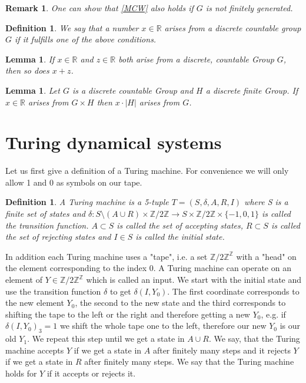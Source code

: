 \documentclass[12pt,a4paper]{scrartcl}
\newtheorem{Definition}[Theorem]{Definition}
\newtheorem{Lemma}[Theorem]{Lemma}
\newtheorem{Remark}[Theorem]{Remark}
\numberwithin{equation}{section}
\newcommand{\R}{\mathbb{R}} %
\newcommand{\Z}{\mathbb{Z}} %
\newcommand{\2}{\mathbb{Z} / 2 \mathbb{Z}}
\newcommand{\1}{\bar{1}}
\newcommand{\0}{\bar{0}}
\begin{document}
\begin{Remark}
	One can show that \ref{MCW} also holds if $G$ is not finitely generated.
\end{Remark}
\begin{Definition}
	We say that a number $x \in \R$ arises from a discrete countable group $G$ if it fulfills one of the above conditions.
\end{Definition}
\begin{Lemma}\label{add}
	If $x \in \R$ and $z \in \R$ both arise from a discrete, countable Group $G$, then so does $x + z$.
\end{Lemma}
\begin{Lemma}\label{mult}
	Let $G$ is a discrete countable Group and $H$ a discrete finite Group. If $x \in \R$ arises from $G \times H$ then $x \cdot |H|$ arises from $G$.
\end{Lemma}
\section{Turing dynamical systems}
Let us first give a definition of a Turing machine. For convenience we will only allow 1 and 0 as symbols on our tape.
\begin{Definition}
	A Turing machine is a 5-tuple $T=(S,\delta, A, R, I)$ where S is a finite set of states and $\delta: S \setminus(A \cup R) \times \2 \to S \times \2 \times \{-1, 0, 1\}$ is called the transition function. $A \subset S$ is called the set of accepting states, $R \subset S$ is called the set of rejecting states and $I \in S$ is called the initial state.
\end{Definition}
In addition each Turing machine uses a "tape", i.e. a set $\Z / 2\Z ^{\Z}$ with a "head" on the element corresponding to the index 0. A Turing machine can operate on an element of $Y \in \Z / 2\Z ^{\Z}$ which is called an input. We start with the initial state and use the transition function $\delta$ to get $\delta(I, Y_0)$. The first coordinate corresponds to the new element $Y_0$, the second to the new state and the third corresponds to shifting the tape to the left or the right and therefore getting a new $Y_0$, e.g. if $\delta(I, Y_0)_3 = 1$ we shift the whole tape one to the left, therefore our new $Y_0$ is our old $Y_1$. We repeat this step until we get a state in $A \cup R$. We say, that the Turing machine accepts $Y$ if we get a state in $A$ after finitely many steps and it rejects $Y$ if we get a state in $R$ after finitely many steps. We say that the Turing machine holds for $Y$ if it accepts or rejects it.
\end{document}
